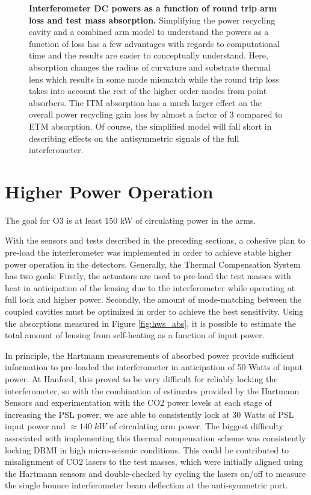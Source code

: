 \begin{figure}
\begin{minipage}{0.5\textheight}
		\end{minipage}
		\caption[Interferometer DC powers as a function of round trip arm loss and test mass absorption.]  
		{\textbf{Interferometer DC powers as a function of round trip arm loss and test mass absorption.}
			Simplifying the power recycling cavity and a combined arm model to understand the powers as a function of loss has a few advantages with regards to computational time and the results are easier to conceptually understand.  Here, absorption changes the radius of curvature and substrate thermal lens which results in some mode mismatch while the round trip loss takes into account the rest of the higher order modes from point absorbers.  The ITM absorption has a much larger effect on the overall power recycling gain loss by almost a factor of 3 compared to ETM absorption.  Of course, the simplified model will fall short in describing effects on the antisymmetric signals of the full interferometer.
		}
		\label{fig:simple_prc_arm}
	\end{figure}

\section{Higher Power Operation}
	The goal for O3 is at least 150 kW of circulating power in the arms.
	
	With the sensors and tests described in the preceding sections, a cohesive plan to pre-load the interferometer was implemented in order to achieve stable higher power operation in the detectors.  Generally, the Thermal Compensation System has two goals: Firstly, the actuators are used to pre-load the test masses with heat in anticipation of the lensing due to the interferometer while operating at full lock and higher power.  Secondly, the amount of mode-matching between the coupled cavities must be optimized in order to achieve the best sensitivity.  Using the absorptions measured in Figure \ref{fig:hws_abs}, it is possible to estimate the total amount of lensing from self-heating as a function of input power.
	
	In principle, the Hartmann measurements of absorbed power provide sufficient information to pre-loaded the interferometer in anticipation of 50 Watts of input power. At Hanford, this proved to be very difficult for reliably locking the interferometer, so with the combination of estimates provided by the Hartmann Sensors and experimentation with the CO2 power levels at each stage of increasing the PSL power, we are able to consistently lock at 30 Watts of PSL input power and $\approx 140 \; kW$ of circulating arm power.  The biggest difficulty associated with implementing this thermal compensation scheme was consistently locking DRMI in high micro-seismic conditions. This could be contributed to misalignment of CO2 lasers to the test masses, which were initially aligned using the Hartmann sensors and double-checked by cycling the lasers on/off to measure the single bounce interferometer beam deflection at the anti-symmetric port.
	
